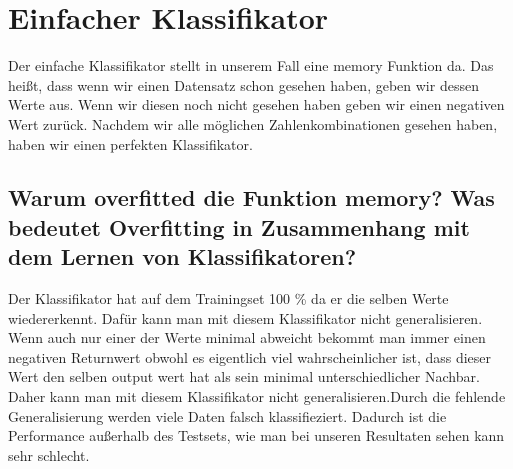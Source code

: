 \section{Einfacher Klassifikator}
\label{ch:implementation}

Der einfache Klassifikator stellt in unserem Fall eine memory Funktion da. Das heißt, dass wenn wir einen Datensatz schon gesehen haben, geben wir dessen Werte aus. Wenn wir diesen noch nicht gesehen haben geben wir einen negativen Wert zurück. Nachdem wir alle möglichen Zahlenkombinationen gesehen haben, haben wir einen perfekten Klassifikator. 



\subsection{Warum overfitted die Funktion memory? Was bedeutet Overfitting in Zusammenhang mit dem Lernen von Klassifikatoren?} 

Der Klassifikator hat auf dem Trainingset 100 \% da er die selben Werte wiedererkennt. Dafür kann man mit diesem Klassifikator nicht generalisieren. Wenn auch nur einer der Werte minimal abweicht bekommt man immer einen negativen Returnwert obwohl es eigentlich viel wahrscheinlicher ist, dass dieser Wert den selben output wert hat als sein minimal unterschiedlicher Nachbar. Daher kann man mit diesem Klassifikator nicht generalisieren.Durch die fehlende Generalisierung werden viele Daten falsch klassifieziert. Dadurch ist die Performance außerhalb des Testsets, wie man bei unseren Resultaten sehen kann sehr schlecht. 

